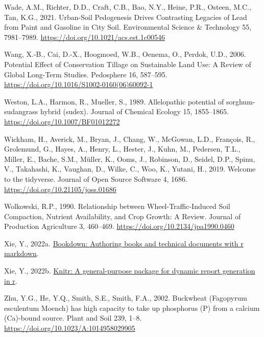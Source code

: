 \documentclass[
  12pt,
]{article}
\newlength{\cslhangindent}
\newlength{\cslentryspacingunit} %
\newenvironment{CSLReferences}[2] %
 {%
  \setlength{\parindent}{0pt}
  \ifodd #1
  \let\oldpar\par
  \def\par{\hangindent=\cslhangindent\oldpar}
  \fi
  \setlength{\parskip}{#2\cslentryspacingunit}
 }%
 {}
\begin{document}
\begin{CSLReferences}{1}{0}
\leavevmode{}%
Wade, A.M., Richter, D.D., Craft, C.B., Bao, N.Y., Heine, P.R., Osteen, M.C., Tan, K.G., 2021. Urban-{Soil Pedogenesis Drives Contrasting Legacies} of {Lead} from {Paint} and {Gasoline} in {City Soil}. Environmental Science \& Technology 55, 7981--7989. \url{https://doi.org/10.1021/acs.est.1c00546}

\leavevmode{}%
Wang, X.-B., Cai, D.-X., Hoogmoed, W.B., Oenema, O., Perdok, U.D., 2006. Potential {Effect} of {Conservation Tillage} on {Sustainable Land Use}: {A Review} of {Global Long-Term Studies}. Pedosphere 16, 587--595. \url{https://doi.org/10.1016/S1002-0160(06)60092-1}

\leavevmode{}%
Weston, L.A., Harmon, R., Mueller, S., 1989. Allelopathic potential of sorghum-sudangrass hybrid (sudex). Journal of Chemical Ecology 15, 1855--1865. \url{https://doi.org/10.1007/BF01012272}

\leavevmode{}%
Wickham, H., Averick, M., Bryan, J., Chang, W., McGowan, L.D., François, R., Grolemund, G., Hayes, A., Henry, L., Hester, J., Kuhn, M., Pedersen, T.L., Miller, E., Bache, S.M., Müller, K., Ooms, J., Robinson, D., Seidel, D.P., Spinu, V., Takahashi, K., Vaughan, D., Wilke, C., Woo, K., Yutani, H., 2019. Welcome to the {tidyverse}. Journal of Open Source Software 4, 1686. \url{https://doi.org/10.21105/joss.01686}

\leavevmode{}%
Wolkowski, R.P., 1990. Relationship between {Wheel-Traffic-Induced Soil Compaction}, {Nutrient Availability}, and {Crop Growth}: {A Review}. Journal of Production Agriculture 3, 460--469. \url{https://doi.org/10.2134/jpa1990.0460}

\leavevmode{}%
Xie, Y., 2022a. \href{https://github.com/rstudio/bookdown}{Bookdown: Authoring books and technical documents with r markdown}.

\leavevmode{}%
Xie, Y., 2022b. \href{https://yihui.org/knitr/}{Knitr: A general-purpose package for dynamic report generation in r}.

\leavevmode{}%
Zhu, Y.G., He, Y.Q., Smith, S.E., Smith, F.A., 2002. Buckwheat ({Fagopyrum} esculentum {Moench}) has high capacity to take up phosphorus ({P}) from a calcium ({Ca})-bound source. Plant and Soil 239, 1--8. \url{https://doi.org/10.1023/A:1014958029905}

\end{CSLReferences}
\end{document}
